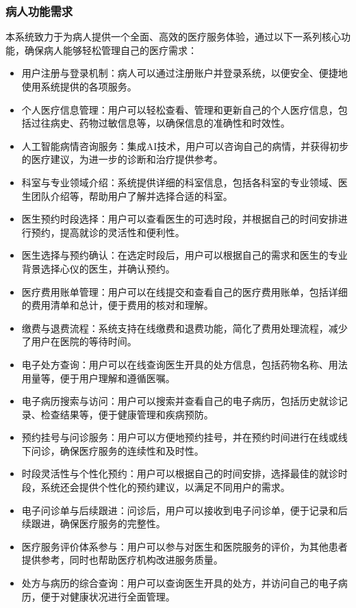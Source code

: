 \subsubsection{病人功能需求}
本系统致力于为病人提供一个全面、高效的医疗服务体验，通过以下一系列核心功能，确保病人能够轻松管理自己的医疗需求：
\begin{itemize}
	\item 用户注册与登录机制：病人可以通过注册账户并登录系统，以便安全、便捷地使用系统提供的各项服务。
	\item 个人医疗信息管理：用户可以轻松查看、管理和更新自己的个人医疗信息，包括过往病史、药物过敏信息等，以确保信息的准确性和时效性。
	\item 人工智能病情咨询服务：集成AI技术，用户可以咨询自己的病情，并获得初步的医疗建议，为进一步的诊断和治疗提供参考。
	\item 科室与专业领域介绍：系统提供详细的科室信息，包括各科室的专业领域、医生团队介绍等，帮助用户了解并选择合适的科室。
	\item 医生预约时段选择：用户可以查看医生的可选时段，并根据自己的时间安排进行预约，提高就诊的灵活性和便利性。
	\item 医生选择与预约确认：在选定时段后，用户可以根据自己的需求和医生的专业背景选择心仪的医生，并确认预约。
	\item 医疗费用账单管理：用户可以在线提交和查看自己的医疗费用账单，包括详细的费用清单和总计，便于费用的核对和理解。
	\item 缴费与退费流程：系统支持在线缴费和退费功能，简化了费用处理流程，减少了用户在医院的等待时间。
	\item 电子处方查询：用户可以在线查询医生开具的处方信息，包括药物名称、用法用量等，便于用户理解和遵循医嘱。
	\item 电子病历搜索与访问：用户可以搜索并查看自己的电子病历，包括历史就诊记录、检查结果等，便于健康管理和疾病预防。
	\item 预约挂号与问诊服务：用户可以方便地预约挂号，并在预约时间进行在线或线下问诊，确保医疗服务的连续性和及时性。
	\item 时段灵活性与个性化预约：用户可以根据自己的时间安排，选择最佳的就诊时段，系统还会提供个性化的预约建议，以满足不同用户的需求。
	\item 电子问诊单与后续跟进：问诊后，用户可以接收到电子问诊单，便于记录和后续跟进，确保医疗服务的完整性。
	\item 医疗服务评价体系参与：用户可以参与对医生和医院服务的评价，为其他患者提供参考，同时也帮助医疗机构改进服务质量。
	\item 处方与病历的综合查询：用户可以查询医生开具的处方，并访问自己的电子病历，便于对健康状况进行全面管理。
\end{itemize}


